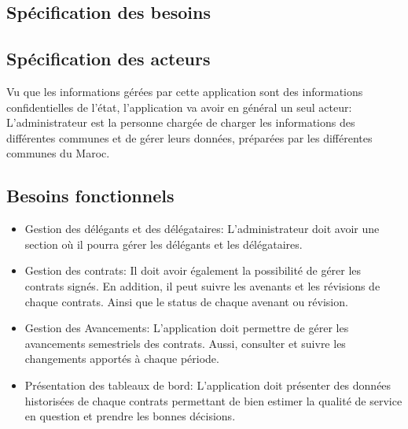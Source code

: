 \documentclass[a4paper]{report}
\begin{document}
\begin{doublespace}
	\section{Spécification des besoins}

	\subsection{Spécification des acteurs}
	Vu que les informations gérées par cette application sont des informations confidentielles de l'état, l'application va avoir en général un seul acteur:
	L'administrateur est la personne chargée de charger les informations des différentes communes et de gérer leurs données, préparées par les différentes communes du Maroc.
	\subsection{Besoins fonctionnels}
	\begin{itemize}
		\item Gestion des délégants et des délégataires: L'administrateur doit avoir
		      une section où il pourra gérer les délégants et les délégataires.
		\item Gestion des contrats: Il doit avoir également la possibilité de gérer les contrats signés. En addition, il peut suivre les avenants et les révisions de chaque contrats. Ainsi que le status de chaque avenant ou révision.
		\item Gestion des Avancements: L'application doit permettre de gérer les avancements semestriels des contrats. Aussi, consulter et suivre les changements apportés à chaque période.
		\item Présentation des tableaux de bord: L'application doit présenter des données historisées de chaque contrats permettant de bien estimer la qualité de service en question et prendre les bonnes décisions.
	\end{itemize}

\end{doublespace}
\end{document}
